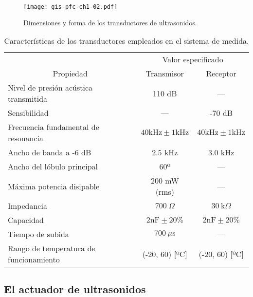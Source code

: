 \begin{figure}
	\begin{center}
		\texttt{[image: gis-pfc-ch1-02.pdf]}
	\end{center}
	\caption[Dimensiones de los transductores de
	ultrasonidos]{Dimensiones y forma de los transductores de
	ultrasonidos.}
	\label{fig:transducers}
\end{figure}

\begin{sidewaystable}
	\centering
	\begin{threeparttable}
	\begin{tabular}{l c c}
		\toprule
		& \multicolumn{2}{c}{Valor especificado\tnote{*}} \\
		\cmidrule(l){2-3}
		\multicolumn{1}{c}{Propiedad} & Transmisor & Receptor \\
		\midrule
		Nivel de presión acústica transmitida & 110 dB & --- \\
		Sensibilidad & --- & -70 dB \\
		Frecuencia fundamental de resonancia
		& $40 \text{kHz} \pm 1 \text{kHz}$
		& $40 \text{kHz} \pm 1 \text{kHz}$ \\
		Ancho de banda a -6 dB & $2.5$ kHz & $3.0$ kHz \\
		Ancho del lóbulo principal & 60º & --- \\
		Máxima potencia disipable & 200 mW (rms) & --- \\
		Impedancia & $700\ \Omega$ & $30\ \text{k}\Omega$ \\
		Capacidad & $2 \text{nF} \pm 20\%$
		& $2 \text{nF} \pm 20\%$ \\
		Tiempo de subida & $700\ \mu\text{s}$ & --- \\
		Rango de temperatura de funcionamiento %
		& (-20, 60) [ºC] & (-20, 60) [ºC] \\
		\bottomrule
	\end{tabular}
	\begin{TableNotes}
	\end{TableNotes}
	\end{threeparttable}
	\caption[Características de los transductores]{Características de
	los transductores empleados en el sistema de medida.}
	\label{tab:transducers}
\end{sidewaystable}


\subsection{El actuador de ultrasonidos}

